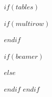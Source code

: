 $if(tables)$
\usepackage{longtable,booktabs,array}
\renewcommand{\arraystretch}{1.0} %
\usepackage{longtable}
$if(multirow)$
\usepackage{multirow}
$endif$
\usepackage{calc} %
$if(beamer)$
\usepackage{caption}
\makeatletter
\def\fnum@table{\tablename~\thetable}
\makeatother
$else$
\usepackage{etoolbox}
\makeatletter
\patchcmd\longtable{\par}{\if@noskipsec\mbox{}\fi\par}{}{}
\makeatother
$endif$
$endif$